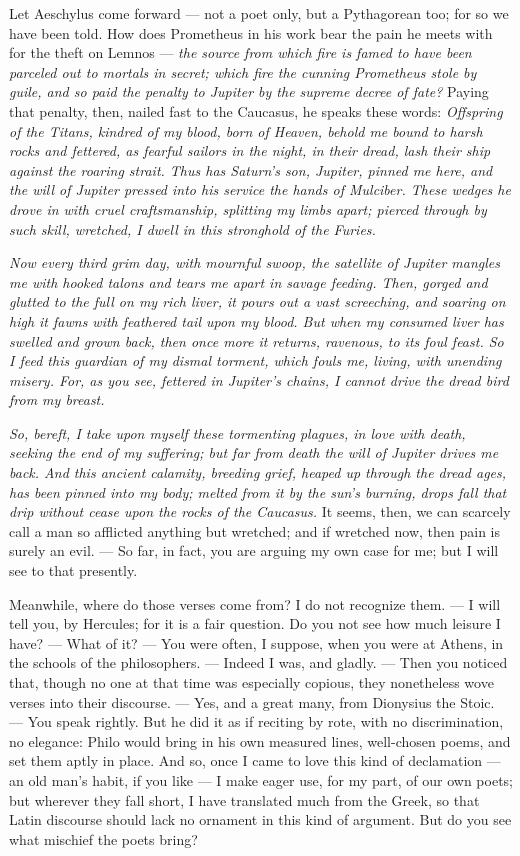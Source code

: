  Let Aeschylus come forward — not a poet only, but a Pythagorean too; for so we have been told. How does Prometheus in his work bear the pain he meets with for the theft on Lemnos — \textit{the source from which fire is famed to have been parceled out to mortals in secret; which fire the cunning Prometheus stole by guile, and so paid the penalty to Jupiter by the supreme decree of fate?} Paying that penalty, then, nailed fast to the Caucasus, he speaks these words: \textit{Offspring of the Titans, kindred of my blood, born of Heaven, behold me bound to harsh rocks and fettered, as fearful sailors in the night, in their dread, lash their ship against the roaring strait. Thus has Saturn's son, Jupiter, pinned me here, and the will of Jupiter pressed into his service the hands of Mulciber. These wedges he drove in with cruel craftsmanship, splitting my limbs apart; pierced through by such skill, wretched, I dwell in this stronghold of the Furies.}

 \textit{Now every third grim day, with mournful swoop, the satellite of Jupiter mangles me with hooked talons and tears me apart in savage feeding. Then, gorged and glutted to the full on my rich liver, it pours out a vast screeching, and soaring on high it fawns with feathered tail upon my blood. But when my consumed liver has swelled and grown back, then once more it returns, ravenous, to its foul feast. So I feed this guardian of my dismal torment, which fouls me, living, with unending misery. For, as you see, fettered in Jupiter's chains, I cannot drive the dread bird from my breast.}

 \textit{So, bereft, I take upon myself these tormenting plagues, in love with death, seeking the end of my suffering; but far from death the will of Jupiter drives me back. And this ancient calamity, breeding grief, heaped up through the dread ages, has been pinned into my body; melted from it by the sun's burning, drops fall that drip without cease upon the rocks of the Caucasus.} It seems, then, we can scarcely call a man so afflicted anything but wretched; and if wretched now, then pain is surely an evil. — So far, in fact, you are arguing my own case for me; but I will see to that presently.

 Meanwhile, where do those verses come from? I do not recognize them. — I will tell you, by Hercules; for it is a fair question. Do you not see how much leisure I have? — What of it? — You were often, I suppose, when you were at Athens, in the schools of the philosophers. — Indeed I was, and gladly. — Then you noticed that, though no one at that time was especially copious, they nonetheless wove verses into their discourse. — Yes, and a great many, from Dionysius the Stoic. — You speak rightly. But he did it as if reciting by rote, with no discrimination, no elegance: Philo would bring in his own measured lines, well-chosen poems, and set them aptly in place. And so, once I came to love this kind of declamation — an old man's habit, if you like — I make eager use, for my part, of our own poets; but wherever they fall short, I have translated much from the Greek, so that Latin discourse should lack no ornament in this kind of argument. But do you see what mischief the poets bring?

